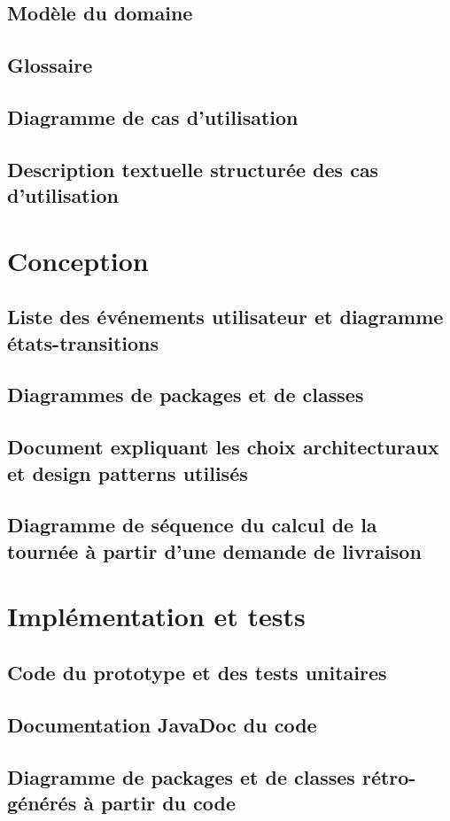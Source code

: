 \documentclass[10pt,a4paper]{book}
\begin{document}
\section{Modèle du domaine}
\section{Glossaire}
\section{Diagramme de cas d'utilisation}
\section{Description textuelle structurée des cas d'utilisation}
\chapter{Conception}
\section{Liste des événements utilisateur et diagramme états-transitions}
\section{Diagrammes de packages et de classes}
\section{Document expliquant les choix architecturaux et design patterns utilisés}
\section{Diagramme de séquence du calcul de la tournée à partir d'une demande de livraison}
\chapter{Implémentation et tests}
\section{Code du prototype et des tests unitaires}
\section{Documentation JavaDoc du code}
\section{Diagramme de packages et de classes rétro-générés à partir du code}
\end{document}
